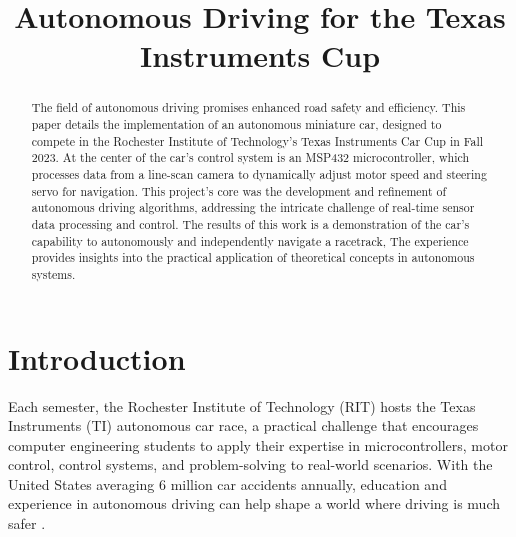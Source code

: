 \documentclass[conference]{IEEEtran}
\begin{document}
\title{Autonomous Driving for the Texas Instruments Cup}

\author{
\and
{}
}

\maketitle

\begin{abstract}
	The field of autonomous driving promises enhanced road safety and efficiency. This paper details the implementation of an autonomous miniature car, designed to compete in the Rochester Institute of Technology's Texas Instruments Car Cup in Fall 2023. At the center of the car's control system is an MSP432 microcontroller, which processes data from a line-scan camera to dynamically adjust motor speed and steering servo for navigation. This project's core was the development and refinement of autonomous driving algorithms, addressing the intricate challenge of real-time sensor data processing and control. The results of this work is a demonstration of the car's capability to autonomously and independently navigate a racetrack, The experience provides insights into the practical application of theoretical concepts in autonomous systems.
\end{abstract}

\section{Introduction}
Each semester, the Rochester Institute of Technology (RIT) hosts the Texas Instruments (TI) autonomous car race, a practical challenge that encourages computer engineering students to apply their expertise in microcontrollers, motor control, control systems, and problem-solving to real-world scenarios. With the United States averaging 6 million car accidents annually, education and experience in autonomous driving can help shape a world where driving is much safer \cite{accidentStats}.
\end{document}
